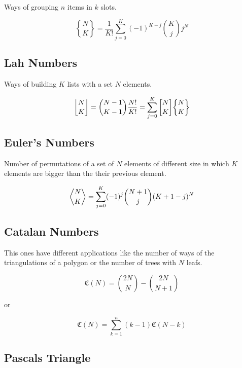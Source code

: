 Ways of grouping \(n\) items in \(k\) slots.

\[
\genfrac{\{}{\}}{0pt}{}{N}{K} = \frac{1}{K!} \sum_{j=0}^{K} (-1)^{K - j} \binom{K}{j} j^N
\]

\subsection{Lah Numbers}

Ways of building \(K\) lists with a set \(N\) elements.

\[
\genfrac{\lfloor}{\rfloor}{0pt}{}{N}{K} = \binom{N - 1}{K - 1} \frac{N!}{K!} = \sum_{j=0}^{K} \genfrac{[}{]}{0pt}{}{N}{K} \genfrac{\{}{\}}{0pt}{}{N}{K}
\]

\subsection{Euler's Numbers}

Number of permutations of a set of \(N\) elements of different size in which
\(K\) elements are bigger than the their previous element.

\[
\genfrac{\langle}{\rangle}{0pt}{}{N}{K} = \sum_{j = 0}^{K} (-1)^j \binom{N + 1}{j} (K + 1 - j)^N
\]

\subsection{Catalan Numbers}

This ones have different applications like the number of ways of the triangulations of
a polygon or the number of trees with \(N\) leafs.

\[\mathfrak{C}(N) = \binom{2N}{N} - \binom{2N}{N + 1}\]

or

\[\mathfrak{C}(N) = \sum_{k=1}^{n}(k - 1) \mathfrak{C}(N - k)\]

\subsection{Pascals Triangle}

